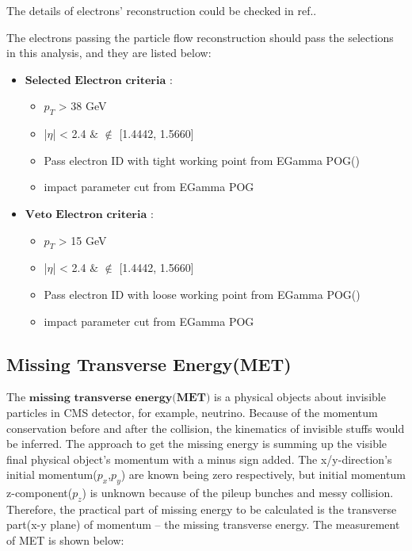 			The details of electrons' reconstruction could be checked in ref.\cite{2015_el_reco}.

			The electrons passing the particle flow reconstruction should pass the selections in this analysis, and they are listed below:

			\begin{itemize}
				\item $\textbf{Selected Electron criteria}$ : 
					\begin{itemize}
						\item $p_T$ > 38 GeV
						\item |$\eta$| < 2.4 $\&$ $\notin$ [1.4442, 1.5660]
						\item Pass electron ID with tight working point from EGamma POG\cite{egamma_POG}()
						\item impact parameter cut from EGamma POG\cite{egamma_POG}
					\end{itemize}
				\item $\textbf{Veto Electron criteria}$ : 
					\begin{itemize}
						\item $p_T$ > 15 GeV
						\item |$\eta$| < 2.4 $\&$ $\notin$ [1.4442, 1.5660]
						\item Pass electron ID with loose working point from EGamma POG\cite{egamma_POG}()
						\item impact parameter cut from EGamma POG\cite{egamma_POG}
					\end{itemize}
			\label{PhysObj:itm:electron_selection}
			\end{itemize}

	\subsection{Missing Transverse Energy(MET)}
	\label{ssec:PhysObj_met}
		The $\textbf{missing}$ $\textbf{transverse}$ $\textbf{energy}$$\textbf{(MET)}$ is a physical objects about invisible particles in CMS detector, for example, neutrino. Because of the momentum conservation before and after the collision, the kinematics of invisible stuffs would be inferred. The approach to get the missing energy is summing up the visible final physical object's momentum with a minus sign added. The x/y-direction's initial momentum($p_x$,$p_y$) are known being zero respectively, but initial momentum z-component($p_z$) is unknown because of the pileup bunches and messy collision. Therefore, the practical part of missing energy to be calculated is the transverse part(x-y plane) of momentum -- the missing transverse energy. The measurement of MET is shown below:


